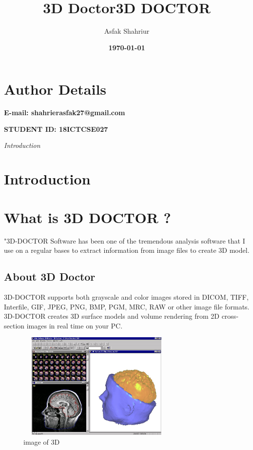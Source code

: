\documentclass{article}
\title{3D Doctor}
\title{\textbf{3D DOCTOR}}
\author{ Asfak Shahriur}
\begin{document}
\maketitle
\section{Author Details }
\begin{LARGE}
\begin{flushleft}
\textbf{E-mail: shahrierasfak27@gmail.com}\\
\end{flushleft}
\begin{flushleft}
\textbf{STUDENT ID: 18ICTCSE027}\\
\end{flushleft}
\date\textbf{\today}
\end{LARGE}
\newpage
\maketitle
\begin{huge}
\begin{center}
\textit{Introduction}
\end{center}
\end{huge}
\tableofcontents
\newpage
\section{Introduction}
\section{\textbf{What is 3D DOCTOR ?}}
"3D-DOCTOR Software has been one of the tremendous analysis software that I use on a regular bases to extract information from image files to create 3D model.
\subsection{About 3D Doctor}
3D-DOCTOR supports both grayscale and color images stored in DICOM, TIFF, Interfile, GIF, JPEG, PNG, BMP, PGM, MRC, RAW or other image file formats. 3D-DOCTOR creates 3D surface models and volume rendering from 2D cross-section images in real time on your PC.
\\
\begin{figure}[h]
\includegraphics[width=300px,height=200px]{c.jpg}
\caption{image of 3D}
\label{shihab}
\end{figure}
\\
\newpage
\end{document}
